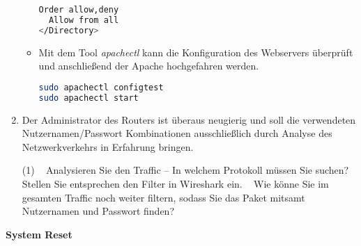 \documentclass[paper=a4,fontsize=11pt]{scrartcl}%
\numberwithin{equation}{section}
\begin{document}
\begin{enumerate}
\begin{itemize}
\begin{lstlisting}[style=Bash, language=Bash]
  Order allow,deny
  Allow from all
</Directory>
\end{lstlisting} \label{conf}
	\item Mit dem Tool \emph{apachectl} kann die Konfiguration des Webservers überprüft und anschließend der Apache hochgefahren werden.
\begin{lstlisting}[style=Bash, language=Bash]
sudo apachectl configtest
sudo apachectl start
\end{lstlisting} \label{apchectl}
\end{itemize}
	\item Der Administrator des Routers ist überaus neugierig und soll die verwendeten Nutzernamen/Passwort Kombinationen ausschließlich durch Analyse des Netzwerkverkehrs in Erfahrung bringen.
	\begin{tasks}(1)
		\task~ Analysieren Sie den Traffic -- In welchem Protokoll müssen Sie suchen?
		\task~ Stellen Sie entsprechen den Filter in Wireshark ein.
		\task~ Wie könne Sie im gesamten Traffic noch weiter filtern, sodass Sie das Paket mitsamt Nutzernamen und Passwort finden?
	\end{tasks}
	\end{enumerate}
\begin{center}\Large{\textbf{System Reset}}\end{center}\vskip0.25in
\end{document}
